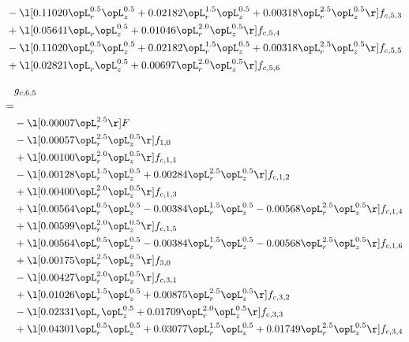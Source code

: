 \begin{alignat}{2}
& - \l[  0.11020 \opL_r^{0.5} \opL_z^{0.5} +  0.02182 \opL_r^{1.5} \opL_z^{0.5} +  0.00318 \opL_r^{2.5} \opL_z^{0.5}  \r] f_{c,5,3} \nonumber \\ 
& + \l[  0.05641 \opL_r \opL_z^{0.5} +  0.01046 \opL_r^{2.0} \opL_z^{0.5}  \r] f_{c,5,4} \nonumber \\ 
& - \l[  0.11020 \opL_r^{0.5} \opL_z^{0.5} +  0.02182 \opL_r^{1.5} \opL_z^{0.5} +  0.00318 \opL_r^{2.5} \opL_z^{0.5}  \r] f_{c,5,5} \nonumber \\ 
& + \l[  0.02821 \opL_r \opL_z^{0.5} +  0.00697 \opL_r^{2.0} \opL_z^{0.5}  \r] f_{c,5,6} \nonumber \\ 
\end{alignat} 


\begin{alignat}{2} 
\label{eq:g_65_0} 
& g_{c,6,5} \nonumber \\ 
 = \\ 
& - \l[  0.00007 \opL_r^{2.5}  \r] F \nonumber \\ 
& - \l[  0.00057 \opL_r^{2.5} \opL_z^{0.5}  \r] f_{1,0} \nonumber \\ 
& + \l[  0.00100 \opL_r^{2.0} \opL_z^{0.5}  \r] f_{c,1,1} \nonumber \\ 
& - \l[  0.00128 \opL_r^{1.5} \opL_z^{0.5} +  0.00284 \opL_r^{2.5} \opL_z^{0.5}  \r] f_{c,1,2} \nonumber \\ 
& + \l[  0.00400 \opL_r^{2.0} \opL_z^{0.5}  \r] f_{c,1,3} \nonumber \\ 
& + \l[  0.00564 \opL_r^{0.5} \opL_z^{0.5}   -0.00384 \opL_r^{1.5} \opL_z^{0.5}   -0.00568 \opL_r^{2.5} \opL_z^{0.5}  \r] f_{c,1,4} \nonumber \\ 
& + \l[  0.00599 \opL_r^{2.0} \opL_z^{0.5}  \r] f_{c,1,5} \nonumber \\ 
& + \l[  0.00564 \opL_r^{0.5} \opL_z^{0.5}   -0.00384 \opL_r^{1.5} \opL_z^{0.5}   -0.00568 \opL_r^{2.5} \opL_z^{0.5}  \r] f_{c,1,6} \nonumber \\ 
& + \l[  0.00175 \opL_r^{2.5} \opL_z^{0.5}  \r] f_{3,0} \nonumber \\ 
& - \l[  0.00427 \opL_r^{2.0} \opL_z^{0.5}  \r] f_{c,3,1} \nonumber \\ 
& + \l[  0.01026 \opL_r^{1.5} \opL_z^{0.5} +  0.00875 \opL_r^{2.5} \opL_z^{0.5}  \r] f_{c,3,2} \nonumber \\ 
& - \l[  0.02331 \opL_r \opL_z^{0.5} +  0.01709 \opL_r^{2.0} \opL_z^{0.5}  \r] f_{c,3,3} \nonumber \\ 
& + \l[  0.04301 \opL_r^{0.5} \opL_z^{0.5} +  0.03077 \opL_r^{1.5} \opL_z^{0.5} +  0.01749 \opL_r^{2.5} \opL_z^{0.5}  \r] f_{c,3,4} \nonumber \\ 

\end{alignat}
